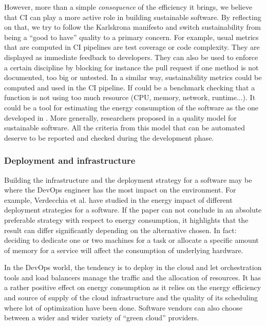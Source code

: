 \documentclass[11pt,twocolumn]{article}
\begin{document}
However, more than a simple \textit{consequence} of the efficiency it brings, we believe that CI can play a more active role in building sustainable software. By reflecting on that, we try to follow the Karlskrona manifesto \cite{beckerSustainabilityDesignSoftware2015} and switch sustainability from being a ``good to have'' quality to a primary concern. For example, usual metrics that are computed in CI pipelines are test coverage or code complexity. They are displayed as immediate feedback to developers. They can also be used to enforce a certain discipline by blocking for instance the pull request if one method is not documented, too big or untested. In a similar way, sustainability metrics could be computed and used in the CI pipeline. If could be a benchmark checking that a function is not using too much resource (CPU, memory, network, runtime...). It could be a tool for estimating the energy consumption of the software as the one developed in \cite{amselGreenTrackerTool2010}. More generally, researchers proposed in \cite{naumannSustainableSoftwareEngineering2015} a quality model for sustainable software. All the criteria from this model that can be automated deserve to be reported and checked during the development phase.



\subsubsection{Deployment and infrastructure}
Building the infrastructure and the deployment strategy for a software may be where the DevOps engineer has the most impact on the environment. For example, Verdecchia et al. have studied in \cite{verdecchiaEstimatingEnergyImpact2017} the energy impact of different deployment strategies for a software. If the paper can not conclude in an absolute preferable strategy with respect to energy consumption, it highlights that the result can differ significantly depending on the alternative chosen. In fact: deciding to dedicate one or two machines for a task or allocate a specific amount of memory for a service will affect the consumption of underlying hardware. 

In the DevOps world, the tendency is to deploy in the cloud and let orchestration tools and load balancers manage the traffic and the allocation of resources. It has a rather positive effect on energy consumption as it relies on the energy efficiency and source of supply of the cloud infrastructure and the quality of its scheduling where lot of optimization have been done. Software vendors can also choose between a wider and wider variety of ``green cloud'' providers.
\end{document}
